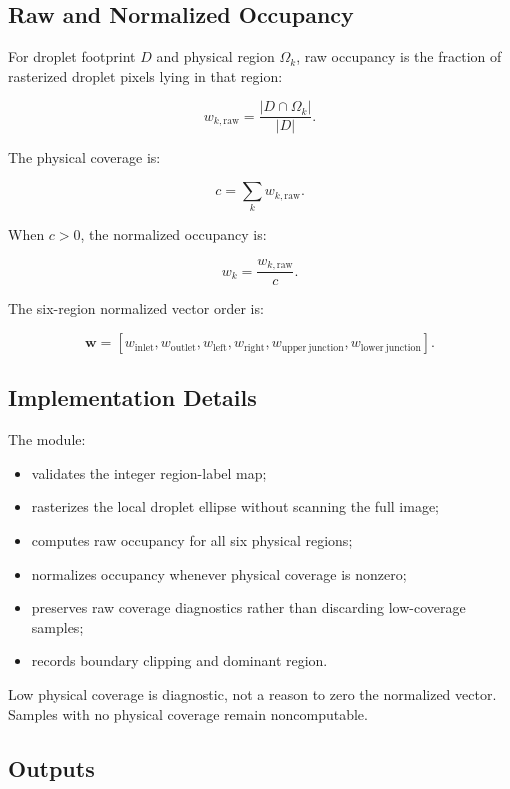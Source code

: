 \subsection{Raw and Normalized Occupancy}

For droplet footprint \(D\) and physical region \(\Omega_k\), raw occupancy is
the fraction of rasterized droplet pixels lying in that region:

\[
w_{k,\mathrm{raw}}
=
\frac{|D \cap \Omega_k|}{|D|}.
\]

The physical coverage is:

\[
c = \sum_{k} w_{k,\mathrm{raw}}.
\]

When \(c>0\), the normalized occupancy is:

\[
w_k = \frac{w_{k,\mathrm{raw}}}{c}.
\]

The six-region normalized vector order is:

\[
\mathbf{w}
=
\left[
w_{\mathrm{inlet}},
w_{\mathrm{outlet}},
w_{\mathrm{left}},
w_{\mathrm{right}},
w_{\mathrm{upper~junction}},
w_{\mathrm{lower~junction}}
\right].
\]

\subsection{Implementation Details}

The module:

\begin{itemize}
  \item validates the integer region-label map;
  \item rasterizes the local droplet ellipse without scanning the full image;
  \item computes raw occupancy for all six physical regions;
  \item normalizes occupancy whenever physical coverage is nonzero;
  \item preserves raw coverage diagnostics rather than discarding low-coverage samples;
  \item records boundary clipping and dominant region.
\end{itemize}

Low physical coverage is diagnostic, not a reason to zero the normalized vector.
Samples with no physical coverage remain noncomputable.

\subsection{Outputs}


